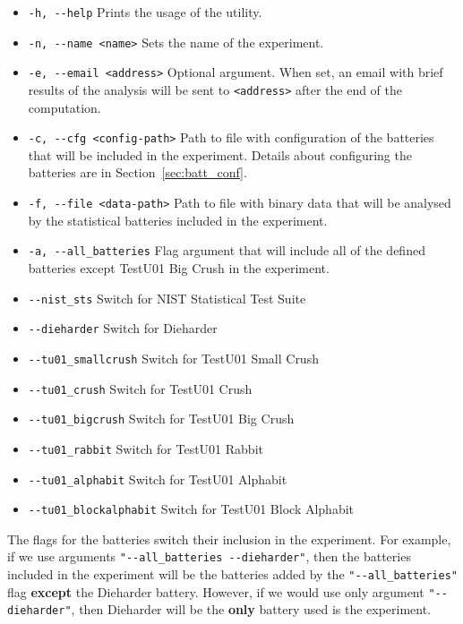 \documentclass[
	digital,    %
	oneside,
	color,
	11pt,
	nocover,
	notable,
	nolof,
	nolot,
]{fithesis3}
\theoremstyle{definition}
\theoremstyle{remark}
\begin{document}
\begin{itemize}
\item \texttt{-h, -{}-help} Prints the usage of the utility.
\item \texttt{-n, -{}-name <name>} Sets the name of the experiment.
\item \texttt{-e, -{}-email <address>} Optional argument. When set, an email with brief results of the analysis will be sent to \texttt{<address>} after the end of the computation.
\item \texttt{-c, -{}-cfg <config-path>} Path to file with configuration of the batteries that will be included in the experiment. Details about configuring the batteries are in Section~\ref{sec:batt_conf}.
\item \texttt{-f, -{}-file <data-path>} Path to file with binary data that will be analysed by the statistical batteries included in the experiment.
\item \texttt{-a, -{}-all\_batteries} Flag argument that will include all of the defined batteries except TestU01 Big Crush in the experiment.
\item \texttt{-{}-nist\_sts} Switch for NIST Statistical Test Suite
\item \texttt{-{}-dieharder} Switch for Dieharder 
\item \texttt{-{}-tu01\_smallcrush} Switch for TestU01 Small Crush
\item \texttt{-{}-tu01\_crush} Switch for TestU01 Crush
\item \texttt{-{}-tu01\_bigcrush} Switch for TestU01 Big Crush
\item \texttt{-{}-tu01\_rabbit} Switch for TestU01 Rabbit
\item \texttt{-{}-tu01\_alphabit} Switch for TestU01 Alphabit
\item \texttt{-{}-tu01\_blockalphabit} Switch for TestU01 Block Alphabit
\end{itemize}

The flags for the batteries switch their inclusion in the experiment. For example, if we use arguments \texttt{"-{}-all\_batteries -{}-dieharder"}, then the batteries included in the experiment will be the batteries added by the \texttt{"-{}-all\_batteries"} flag \textbf{except} the Dieharder battery. However, if we would use only argument \texttt{"-{}-dieharder"}, then Dieharder will be the \textbf{only} battery used is the experiment.
\end{document}

